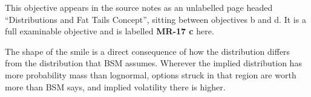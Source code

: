 
\begin{mrtrapbox}[title={Labelling note}]
This objective appears in the source notes as an unlabelled page headed ``Distributions and Fat
Tails Concept'', sitting between objectives b and d. It is a full examinable objective and is
labelled \textbf{MR-17 c} here.
\end{mrtrapbox}

The shape of the smile is a direct consequence of how the  distribution differs
from the  distribution that BSM assumes. Wherever the implied distribution has
more probability mass than lognormal, options struck in that region are worth more than BSM
says, and implied volatility there is higher.

